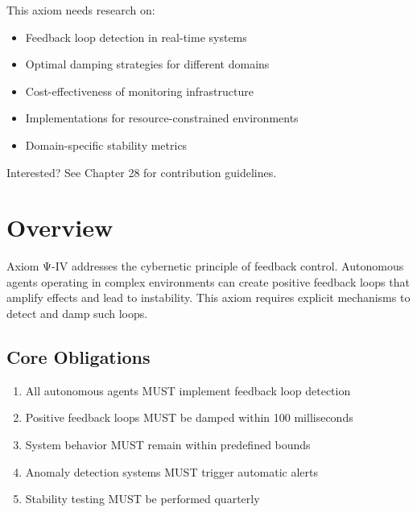\begin{tcolorbox}[colback=lightgray, colframe=accentgold, title=\textbf{🎯 Contribution Opportunity}]
This axiom needs research on:
\begin{itemize}
    \item Feedback loop detection in real-time systems
    \item Optimal damping strategies for different domains
    \item Cost-effectiveness of monitoring infrastructure
    \item Implementations for resource-constrained environments
    \item Domain-specific stability metrics
\end{itemize}

Interested? See Chapter 28 for contribution guidelines.
\end{tcolorbox}

\vspace{0.5cm}

\section{Overview}

Axiom Ψ-IV addresses the cybernetic principle of feedback control. Autonomous agents operating in complex environments can create positive feedback loops that amplify effects and lead to instability. This axiom requires explicit mechanisms to detect and damp such loops.

\subsection{Core Obligations}

\begin{enumerate}
    \item All autonomous agents MUST implement feedback loop detection
    \item Positive feedback loops MUST be damped within 100 milliseconds
    \item System behavior MUST remain within predefined bounds
    \item Anomaly detection systems MUST trigger automatic alerts
    \item Stability testing MUST be performed quarterly
\end{enumerate}

